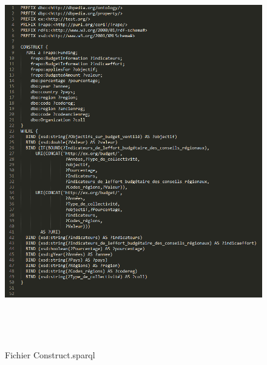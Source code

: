 \documentclass[a4paper,sffamily,12pt]{article}
\begin{document}
		\begin{figure}[!h]
				
			\centerline{\includegraphics[height=17cm]{picture/constructv1.png}}
			\caption{Fichier Construct.sparql}
			\label{constructv1}
			
		\end{figure}		
	
		\newpage
\end{document}
